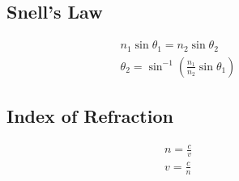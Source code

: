 \documentclass{article}
\begin{document}
\begin{figure}[ht]
    \begin{minipage}[t]{0.4\textwidth}
        \subsection{Snell's Law}
        \begin{gather}
            n_1\sin\theta_1 = n_2\sin\theta_2 \\
            \theta_2 = \sin^{-1}\left(\frac{n_1}{n_2}\sin\theta_1\right)
        \end{gather}
    \end{minipage}
    \hfill\vline\hfill
    \begin{minipage}[t]{0.4\textwidth}
        \subsection{Index of Refraction}
        \begin{gather}
            n = \frac{c}{v} \\
            v = \frac{c}{n}
        \end{gather}
    \end{minipage}
\end{figure}
\end{document}
